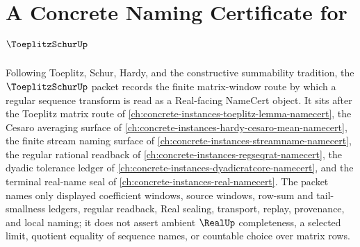 \chapter{A Concrete Naming Certificate for $\ToeplitzSchurUp$}
\label{ch:concrete-instances-toeplitz-schur-namecert}

Following Toeplitz, Schur, Hardy, and the constructive summability tradition, the $\ToeplitzSchurUp$ packet records the finite matrix-window route by which a regular sequence transform is read as a Real-facing NameCert object. It sits after the Toeplitz matrix route of \autoref{ch:concrete-instances-toeplitz-lemma-namecert}, the Cesaro averaging surface of \autoref{ch:concrete-instances-hardy-cesaro-mean-namecert}, the finite stream naming surface of \autoref{ch:concrete-instances-streamname-namecert}, the regular rational readback of \autoref{ch:concrete-instances-regseqrat-namecert}, the dyadic tolerance ledger of \autoref{ch:concrete-instances-dyadicratcore-namecert}, and the terminal real-name seal of \autoref{ch:concrete-instances-real-namecert}. The packet names only displayed coefficient windows, source windows, row-sum and tail-smallness ledgers, regular readback, Real sealing, transport, replay, provenance, and local naming; it does not assert ambient $\RealUp$ completeness, a selected limit, quotient equality of sequence names, or countable choice over matrix rows.

